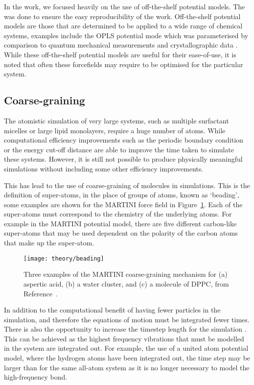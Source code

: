 In the work, we focused heavily on the use of off-the-shelf potential models.
The was done to ensure the easy reproducibility of the work.
Off-the-shelf potential models are those that are determined to be applied to a wide range of chemical systems, examples include the OPLS potential mode which was parameterised by comparison to quantum mechanical measurements and crystallographic data \cite{jorgensen_opls_1988}.
While these off-the-shelf potential models are useful for their ease-of-use, it is noted that often these forcefields may require to be optimised for the particular system.

\subsection{Coarse-graining}
\label{sec:coarsegraining}
The atomistic simulation of very large systems, such as multiple surfactant micelles or large lipid monolayers, require a huge number of atoms.
While computational efficiency improvements such as the periodic boundary condition or the energy cut-off distance are able to improve the time taken to simulate these systems.
However, it is still not possible to produce physically meaningful simulations without including some other efficiency improvements.

This has lead to the use of coarse-graining of molecules in simulations.
This is the definition of super-atoms, in the place of groups of atoms, known as `beading', some examples are shown for the MARTINI force field in Figure~\ref{fig:cg}.
Each of the super-atoms must correspond to the chemistry of the underlying atoms.
For example in the MARTINI potential model, there are five different carbon-like super-atoms that may be used dependent on the polarity of the carbon atoms that make up the super-atom.
%
\begin{figure}
    \centering
    \texttt{[image: theory/beading]}
    \caption{Three examples of the MARTINI coarse-graining mechanism for (a) aspertic acid, (b) a water cluster, and (c) a molecule of DPPC, from Reference~\cite{pluhackova_biomembranes_2015}.}
    \label{fig:cg}
\end{figure}
%

In addition to the computational benefit of having fewer particles in the simulation, and therefore the equations of motion must be integrated fewer times.
There is also the opportunity to increase the timestep length for the simulation \cite{pluhackova_biomembranes_2015}.
This can be achieved as the highest frequency vibrations that must be modelled in the system are integrated out.
For example, the use of a united atom potential model, where the hydrogen atoms have been integrated out, the time step may be larger than for the same all-atom system as it is no longer necessary to model the high-frequency  bond.

